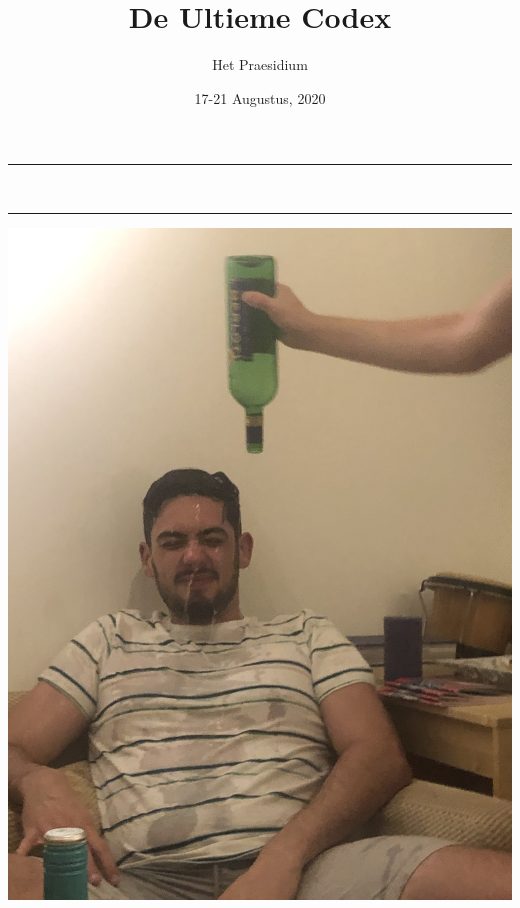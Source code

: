 \documentclass[10pt]{article}
\title{De Ultieme Codex}
\date{{17-21 Augustus, 2020}}
\author{Het Praesidium} %
\begin{document}
\begin{titlepage}
\centering
\vspace*{0.5cm}
\hrule
\vspace{0.4cm}
{\LARGE \textsc{\thetitle}}\\[0.4cm]
\vspace{0.4cm}
\hrule
\vspace{15mm}

\includegraphics[scale=0.07]{image.jpeg}  %

\vfill
\vspace{1.5cm}
{\Large \thedate}
\vspace{2cm}
\end{titlepage}
\thispagestyle{empty}
\end{document}

